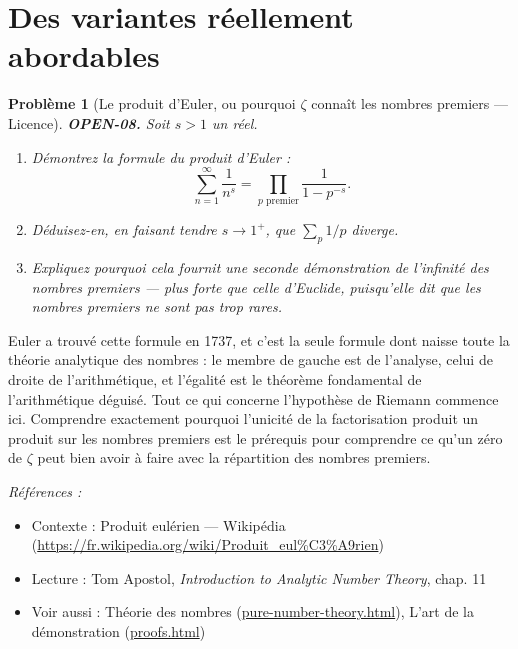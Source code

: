 \documentclass[11pt]{article}
\newtheorem{problem}{Problème}
\newenvironment{refs}{\par\small\noindent\emph{Références :}\begin{itemize}\setlength\itemsep{0pt}}{\end{itemize}\normalsize}
\begin{document}
\bigskip


\section*{Des variantes réellement abordables}

\begin{problem}[{Le produit d'Euler, ou pourquoi $ \zeta $ connaît les nombres premiers --- Licence}]
\textbf{OPEN-08.} Soit $ s > 1 $ un réel.
\begin{enumerate}
\item[(a)] Démontrez la formule du produit d'Euler :
\[ \sum_{n=1}^{\infty} \frac{1}{n^s} = \prod_{p \text{ premier}} \frac{1}{1 - p^{-s}} . \]
\item[(b)] Déduisez-en, en faisant tendre $ s \to 1^{+} $, que $ \sum_{p} 1/p $ diverge.
\item[(c)] Expliquez pourquoi cela fournit une seconde démonstration de l'infinité des nombres
premiers --- plus forte que celle d'Euclide, puisqu'elle dit que les nombres premiers ne
sont pas trop rares.
\end{enumerate}

\end{problem}

\noindent Euler a trouvé cette formule en 1737, et c'est la seule formule dont
naisse toute la théorie analytique des nombres : le membre de gauche est de l'analyse,
celui de droite de l'arithmétique, et l'égalité est le théorème fondamental de
l'arithmétique déguisé. Tout ce qui concerne l'hypothèse de Riemann commence ici.
Comprendre exactement pourquoi l'unicité de la factorisation produit un produit sur les
nombres premiers est le prérequis pour comprendre ce qu'un zéro de $ \zeta $ peut bien
avoir à faire avec la répartition des nombres premiers.

\begin{refs}
\item Contexte : Produit eulérien --- Wikipédia (\url{https://fr.wikipedia.org/wiki/Produit_eul%C3%A9rien})
\item Lecture : Tom Apostol, \textit{Introduction to Analytic Number Theory}, chap. 11
\item Voir aussi : Théorie des nombres (\url{pure-number-theory.html}), L'art de la démonstration (\url{proofs.html})
\end{refs}

\bigskip
\end{document}
